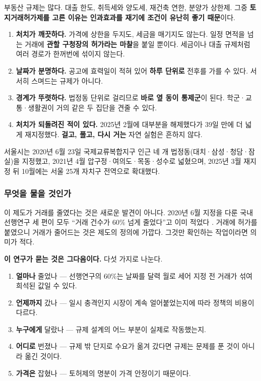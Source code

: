 부동산 규제는 많다. 대출 한도, 취득세와 양도세, 재건축 연한, 분양가 상한제. 그중
\textbf{토지거래허가제를 고른 이유는 인과효과를 재기에 조건이 유난히 좋기
때문}이다.

\begin{enumerate}[leftmargin=2em, itemsep=3pt]
  \item \textbf{처치가 깨끗하다.} 가격에 상한을 두지도, 세금을 매기지도 않는다.
        일정 면적을 넘는 거래에 \textbf{관할 구청장의 허가라는 마찰}을 붙일
        뿐이다. 세금이나 대출 규제처럼 여러 경로가 한꺼번에 섞이지 않는다.
  \item \textbf{날짜가 분명하다.} 공고에 효력일이 적혀 있어 \textbf{하루 단위로}
        전후를 가를 수 있다. 서서히 스며드는 규제가 아니다.
  \item \textbf{경계가 뚜렷하다.} 법정동 단위로 걸리므로 \textbf{바로 옆 동이
        통제군}이 된다. 학군·교통·생활권이 거의 같은 두 집단을 견줄 수 있다.
  \item \textbf{처치가 되돌려진 적이 있다.} 2025년 2월에 대부분을 해제했다가
        39일 만에 더 넓게 재지정했다. \textbf{걸고, 풀고, 다시 거는} 자연 실험은
        흔하지 않다.
\end{enumerate}

서울시는 2020년 6월 23일 국제교류복합지구 인근 네 개 법정동(대치·삼성·청담·잠실)을
지정했고, 2021년 4월 압구정·여의도·목동·성수로 넓혔으며, 2025년 3월 재지정 뒤
10월에는 서울 25개 자치구 전역으로 확대했다.

\subsubsection*{무엇을 물을 것인가}

이 제도가 거래를 줄였다는 것은 새로운 발견이 아니다. 2020년 6월 지정을 다룬
국내 선행연구 세 편이 모두 ``거래 건수가 60\% 넘게 줄었다''고 이미 적었다
\citep{jeon2025, lee2025, yang2025}. 거래에 허가를 붙였으니 거래가 줄어드는 것은
제도의 정의에 가깝다. 그것만 확인하는 작업이라면 의미가 적다.

\textbf{이 연구가 묻는 것은 그다음이다.} 다섯 가지로 나눈다.

\begin{enumerate}[leftmargin=2em, itemsep=2pt]
  \item \textbf{얼마나} 줄었나 --- 선행연구의 60\%는 날짜를 달력 월로 세어
        지정 전 거래가 섞여 희석된 값일 수 있다.
  \item \textbf{언제까지} 갔나 --- 일시 충격인지 시장이 계속 얼어붙었는지에
        따라 정책의 비용이 다르다.
  \item \textbf{누구에게} 달랐나 --- 규제 설계의 어느 부분이 실제로 작동했는지.
  \item \textbf{어디로} 번졌나 --- 규제 밖 단지로 수요가 옮겨 갔다면 규제는
        문제를 푼 것이 아니라 옮긴 것이다.
  \item \textbf{가격은} 잡혔나 --- 토허제의 명분이 가격 안정이기 때문이다.
\end{enumerate}

